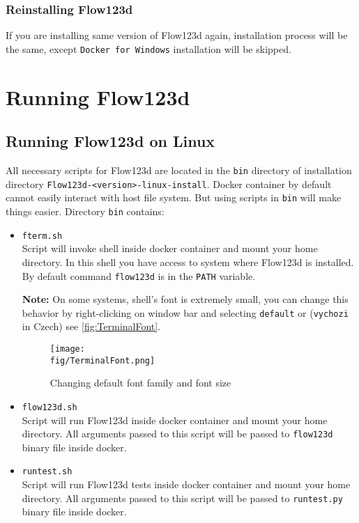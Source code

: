 \subsubsection{Reinstalling Flow123d}
\label{duplicit-image}
If you are installing same version of Flow123d again, installation process will be the same,
except \verb'Docker for Windows' installation will be skipped.


\section{Running Flow123d}
\subsection{Running Flow123d on Linux}
\label{subsec:running-flow123d-on-linux}
All necessary scripts for Flow123d are located in the \verb'bin' directory of installation directory \verb'Flow123d-<version>-linux-install'.
Docker container by default cannot easily interact with host file system. But using scripts in \verb'bin' will make things easier.
Directory \verb'bin' contains:
\begin{itemize}
	\item \verb'fterm.sh' \\
	 Script will invoke shell inside docker container and mount your home directory.
	 In this shell you have access to system where Flow123d is installed. By default command \verb'flow123d' is in the \verb'PATH' variable.
	 
	\textbf{Note:} On some systems, shell's font is extremely small, you can change this behavior by right-clicking on window bar and selecting 
	\verb'default' or (\verb'vychozi' in Czech) see \autoref{fig:TerminalFont}.
	 \begin{figure}
		 \center
		 \texttt{[image: \\fig/TerminalFont.png]}
		 \caption{Changing default font family and font size}
		 \label{fig:TerminalFont}
	 \end{figure}

	\item \verb'flow123d.sh' \\
	 Script will run Flow123d inside docker container and mount your home  directory.
	 All arguments passed to this script will be passed to \verb'flow123d' binary file inside docker.

	\item \verb'runtest.sh' \\
	 Script will run Flow123d tests inside docker container and mount your home  directory.
	 All arguments passed to this script will be passed to \verb'runtest.py' binary file inside docker.
\end{itemize}

